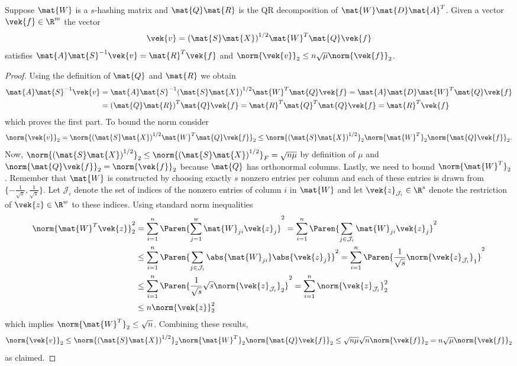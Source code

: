\begin{lemma}\label{thm:perturbation-vector}
Suppose \(\mat{W}\) is a \(s\)-hashing matrix and \(\mat{Q}\mat{R}\) is the QR decomposition of \(\mat{W}\mat{D}\mat{A}^T\).
Given a vector \(\vek{f} \in \R^m\) the vector
\[ \vek{v} = {(\mat{S}\mat{X})}^{1/2} \mat{W}^T \mat{Q} \vek{f} \]
satisfies \( \mat{A}\mat{S}^{-1}\vek{v} = \mat{R}^T \vek{f} \) and \(\norm{\vek{v}}_2 \leq n \sqrt{\mu} \norm{\vek{f}}_2\).
\end{lemma}
\begin{proof}
Using the definition of \(\mat{Q}\) and \(\mat{R}\) we obtain
\begin{align*}
  \mat{A} \mat{S}^{-1} \vek{v}
  &= \mat{A} \mat{S}^{-1} {(\mat{S}\mat{X})}^{1/2} \mat{W}^T \mat{Q} \vek{f}
   = \mat{A} \mat{D} \mat{W}^T \mat{Q} \vek{f} \\
  &= {(\mat{Q} \mat{R})}^T \mat{Q} \vek{f}
   = \mat{R}^T \mat{Q}^T \mat{Q} \vek{f}
   = \mat{R}^T \vek{f}
\end{align*}
which proves the first part.
To bound the norm consider
\[ 
  \norm{\vek{v}}_2
  = \norm{{(\mat{S}\mat{X})}^{1/2} \mat{W}^T \mat{Q} \vek{f}}_2
  \leq \norm{{(\mat{S}\mat{X})}^{1/2}}_2 \norm{\mat{W}^T}_2 \norm{\mat{Q} \vek{f}}_2.
\]
Now, \(\norm{{(\mat{S}\mat{X})}^{1/2}}_2 \leq \norm{{(\mat{S}\mat{X})}^{1/2}}_F = \sqrt{n \mu}\) by definition of \(\mu\) and \(\norm{\mat{Q}\vek{f}}_2 = \norm{\vek{f}}_2\) because \(\mat{Q}\) has orthonormal columns.
Lastly, we need to bound \(\norm{\mat{W}^T}_2\).
Remember that \(\mat{W}\) is constructed by choosing exactly \(s\) nonzero entries per column and each of these entries is drawn from \(\{-\frac{1}{\sqrt{s}}, \frac{1}{\sqrt{s}}\}\).
Let \(\mathcal{J}_i\) denote the set of indices of the nonzero entries of column \(i\) in \(\mat{W}\) and let \(\vek{z}_{\mathcal{J}_i} \in \R^s\) denote the restriction of \(\vek{z} \in \R^w\) to these indices.
Using standard norm inequalities
\begin{align*}
  \norm{\mat{W}^T \vek{z}}_2^2 &= \sum_{i=1}^{n} \Paren{ \sum_{j=1}^{w} \mat{W}_{ji} \vek{z}_j }^2 = \sum_{i=1}^{n} \Paren{ \sum_{j \in \mathcal{J}_i} \mat{W}_{ji} \vek{z}_j }^2 \\
  &\leq \sum_{i=1}^{n} \Paren{ \sum_{j \in \mathcal{J}_i} \abs{\mat{W}_{ji}} \abs{\vek{z}_j} }^2 = \sum_{i=1}^{n} \Paren{ \frac{1}{\sqrt{s}} \norm{\vek{z}_{\mathcal{J}_i}}_1 }^2 \\
  &\leq \sum_{i=1}^{n} \Paren{ \frac{1}{\sqrt{s}} \sqrt{s} \norm{\vek{z}_{\mathcal{J}_i}}_2 }^2 = \sum_{i=1}^{n} \norm{\vek{z}_{\mathcal{J}_i}}_2^2 \\
  &\leq n \norm{\vek{z}}_2^2
\end{align*}
which implies \(\norm{\mat{W}^T}_2 \leq \sqrt{n}\).
Combining these results,
\[ 
  \norm{\vek{v}}_2
  \leq \norm{{(\mat{S}\mat{X})}^{1/2}}_2 \norm{\mat{W}^T}_2 \norm{\mat{Q} \vek{f}}_2
  \leq \sqrt{n \mu} \sqrt{n} \norm{\vek{f}}_2 = n \sqrt{\mu} \norm{\vek{f}}_2
\]
as claimed.
\end{proof}

